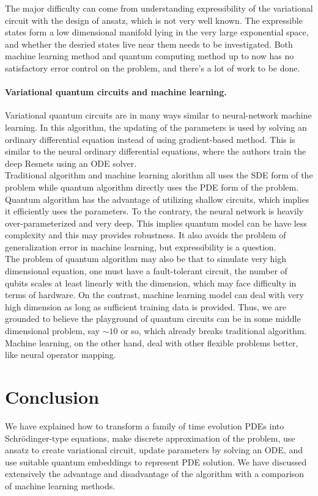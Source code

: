 \documentclass[11pt]{article}
\theoremstyle{definition}
\begin{document}
The major difficulty can come from understanding expressibility of the variational circuit with the design of ansatz, which is not very well known. The expressible states form a low dimensional manifold lying in the very large exponential space, and whether the desried states live near them needs to be investigated.
Both machine learning method and quantum computing method up to now has no satisfactory error control on the problem, and there's a lot of work to be done.\\
\paragraph{Variational quantum circuits and machine learning. }
Variational quantum circuits are in many ways similar to neural-network machine learning. In this algorithm, the updating of the parameters is used by solving an ordinary differential equation instead of using gradient-based method. This is similar to the neural ordinary differential equations\cite{DBLP:journals/corr/abs-1806-07366}, where the authors train the deep Resnets using an ODE solver. \\

Traditional algorithm and machine learning alorithm all uses the SDE form of the problem while quantum algorithm directly uses the PDE form of the problem. Quantum algorithm has the advantage of utilizing shallow circuits, which implies it efficiently uses the parameters. To the contrary, the neural network is heavily over-parameterized and very deep. This implies quantum model can be have less complexity and this may provides robustness. It also avoids the problem of generalization error in machine learning, but expressibility is a question.\\
The problem of quantum algorithm may also be that to simulate very high dimensional equation, one must have a fault-tolerant circuit, the number of qubits scales at least linearly with the dimension, which may face difficulty in terms of hardware. On the contrast, machine learning model can deal with very high dimension as long as sufficient training data is provided. Thus, we are grounded to believe the playground of quantum circuits can be in some middle dimensional problem, say $\sim 10$ or so, which already breaks traditional algorithm. Machine learning, on the other hand, deal with other flexible problems better, like neural operator mapping.  

\section{Conclusion}
We have explained how to transform a family of  time evolution PDEs into Schrödinger-type equations, make discrete approximation of the problem, use ansatz to create variational circuit, update parameters by solving an ODE, and use suitable quantum embeddings to represent PDE solution. We have discussed extensively the advantage and disadvantage of the algorithm with a comparison of machine learning methods.\\
\end{document}

